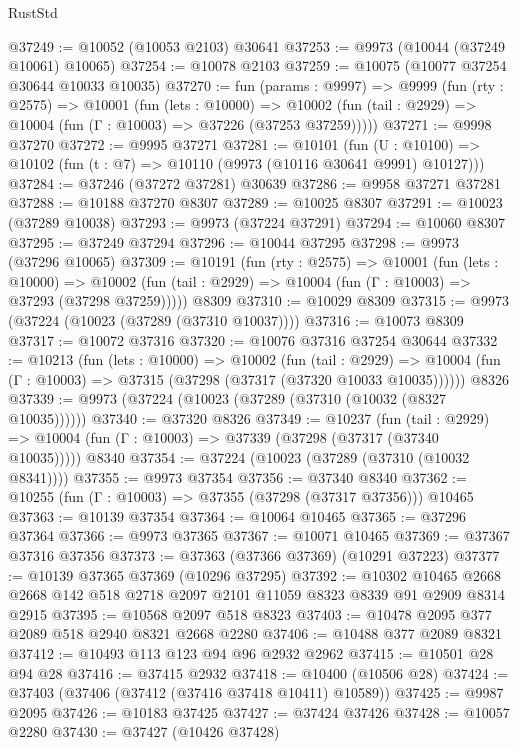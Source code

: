 \begin{lexlean}{RustStd}
\begin{coremodule}
@37249 := @10052 (@10053 @2103) @30641
@37253 := @9973 (@10044 (@37249 @10061) @10065)
@37254 := @10078 @2103
@37259 := @10075 (@10077 @37254 @30644 @10033 @10035)
@37270 := fun (params : @9997) =>
  @9999
    (fun (rty : @2575) =>
    @10001
      (fun (lets : @10000) =>
      @10002 (fun (tail : @2929) => @10004 (fun (Γ : @10003) => @37226 (@37253 @37259)))))
@37271 := @9998 @37270
@37272 := @9995 @37271
@37281 := @10101
    (fun (U : @10100) => @10102 (fun (t : @7) => @10110 (@9973 (@10116 @30641 @9991) @10127)))
@37284 := @37246 (@37272 @37281) @30639
@37286 := @9958 @37271 @37281
@37288 := @10188 @37270 @8307
@37289 := @10025 @8307
@37291 := @10023 (@37289 @10038)
@37293 := @9973 (@37224 @37291)
@37294 := @10060 @8307
@37295 := @37249 @37294
@37296 := @10044 @37295
@37298 := @9973 (@37296 @10065)
@37309 := @10191
    (fun (rty : @2575) =>
    @10001
      (fun (lets : @10000) =>
      @10002 (fun (tail : @2929) => @10004 (fun (Γ : @10003) => @37293 (@37298 @37259)))))
    @8309
@37310 := @10029 @8309
@37315 := @9973 (@37224 (@10023 (@37289 (@37310 @10037))))
@37316 := @10073 @8309
@37317 := @10072 @37316
@37320 := @10076 @37316 @37254 @30644
@37332 := @10213
    (fun (lets : @10000) =>
    @10002
      (fun (tail : @2929) =>
      @10004 (fun (Γ : @10003) => @37315 (@37298 (@37317 (@37320 @10033 @10035))))))
    @8326
@37339 := @9973 (@37224 (@10023 (@37289 (@37310 (@10032 (@8327 @10035))))))
@37340 := @37320 @8326
@37349 := @10237
    (fun (tail : @2929) => @10004 (fun (Γ : @10003) => @37339 (@37298 (@37317 (@37340 @10035)))))
    @8340
@37354 := @37224 (@10023 (@37289 (@37310 (@10032 @8341))))
@37355 := @9973 @37354
@37356 := @37340 @8340
@37362 := @10255 (fun (Γ : @10003) => @37355 (@37298 (@37317 @37356))) @10465
@37363 := @10139 @37354
@37364 := @10064 @10465
@37365 := @37296 @37364
@37366 := @9973 @37365
@37367 := @10071 @10465
@37369 := @37367 @37316 @37356
@37373 := @37363 (@37366 @37369) (@10291 @37223)
@37377 := @10139 @37365 @37369 (@10296 @37295)
@37392 := @10302
    @10465
    @2668
    @2668
    @142
    @518
    @2718
    @2097
    @2101
    @11059
    @8323
    @8339
    @91
    @2909
    @8314
    @2915
@37395 := @10568 @2097 @518 @8323
@37403 := @10478 @2095 @377 @2089 @518 @2940 @8321 @2668 @2280
@37406 := @10488 @377 @2089 @8321
@37412 := @10493 @113 @123 @94 @96 @2932 @2962
@37415 := @10501 @28 @94 @28
@37416 := @37415 @2932
@37418 := @10400 (@10506 @28)
@37424 := @37403 (@37406 (@37412 (@37416 @37418 @10411) @10589))
@37425 := @9987 @2095
@37426 := @10183 @37425
@37427 := @37424 @37426
@37428 := @10057 @2280
@37430 := @37427 (@10426 @37428)

\end{coremodule}
\end{lexlean}
